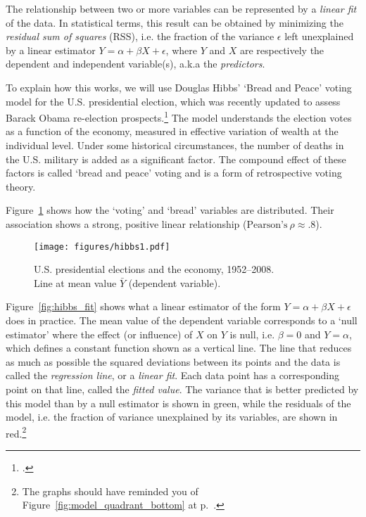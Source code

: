  The relationship between two or more variables can be represented by a \emph{linear fit} of the data. In statistical terms, this result can be obtained by minimizing the \emph{residual sum of squares} (RSS), i.e. the fraction of the variance $\epsilon$ left unexplained by a linear estimator $Y = \alpha + \beta X + \epsilon$, where $Y$ and $X$ are respectively the dependent and independent variable(s), a.k.a the \emph{predictors}.

  To explain how this works, we will use Douglas Hibbs' `Bread and Peace' voting model for the U.S. presidential election, which was recently updated to assess Barack Obama re-election prospects.\footcite{Hibbs:2012a} The model understands the election votes as a function of the economy, measured in effective variation of wealth at the individual level. Under some historical circumstances, the number of deaths in the U.S. military is added as a significant factor. The compound effect of these factors is called `bread and peace' voting and is a form of retrospective voting theory.

  Figure~\ref{fig:hibbs_data} shows how the `voting' and `bread' variables are distributed. Their association shows a strong, positive linear relationship ($\text{Pearson's}~\rho \approx .8$).

  \begin{figure}[htp]
  	\texttt{[image: figures/hibbs1.pdf]}

  	\caption[U.S. presidential elections]{\label{fig:hibbs_data}
  	U.S. presidential elections and the economy, 1952--2008.\\
  	Line at mean value $\bar Y$ (dependent variable). }
  \end{figure}%

  Figure~\ref{fig:hibbs_fit} shows what a linear estimator of the form $Y = \alpha + \beta X + \epsilon$ does in practice. The mean value of the dependent variable corresponds to a `null estimator' where the effect (or influence) of $X$ on $Y$ is null, i.e. $\beta = 0$ and $Y = \alpha$, which defines a constant function shown as a vertical line. The line that reduces as much as possible the squared deviations between its points and the data is called the \emph{regression line}, or a \emph{linear fit}. Each data point has a corresponding point on that line, called the \emph{fitted value}. The variance that is better predicted by this model than by a null estimator is shown in green, while the residuals of the model, i.e. the fraction of variance unexplained by its variables, are shown in red.\footnote{The graphs should have reminded you of Figure~\ref{fig:model_quadrant_bottom} at p.~\pageref{fig:model_quadrant_bottom}.}

